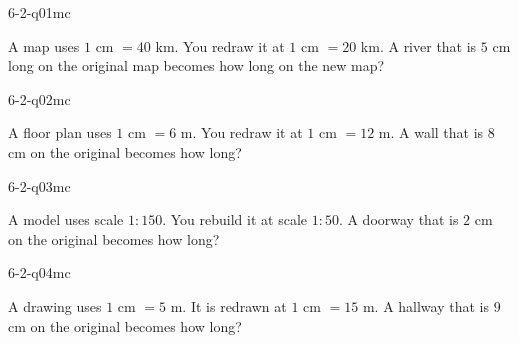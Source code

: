 

\begin{practiceQuestion}{6-2-q01}{mc}
\begin{questionText}
A map uses $1$ cm $= 40$ km. You redraw it at $1$ cm $= 20$ km. A river that is $5$ cm long on the original map becomes how long on the new map?
\end{questionText}
\end{practiceQuestion}

\begin{practiceQuestion}{6-2-q02}{mc}
\begin{questionText}
A floor plan uses $1$ cm $= 6$ m. You redraw it at $1$ cm $= 12$ m. A wall that is $8$ cm on the original becomes how long?
\end{questionText}
\end{practiceQuestion}

\begin{practiceQuestion}{6-2-q03}{mc}
\begin{questionText}
A model uses scale $1:150$. You rebuild it at scale $1:50$. A doorway that is $2$ cm on the original becomes how long?
\end{questionText}
\end{practiceQuestion}

\begin{practiceQuestion}{6-2-q04}{mc}
\begin{questionText}
A drawing uses $1$ cm $= 5$ m. It is redrawn at $1$ cm $= 15$ m. A hallway that is $9$ cm on the original becomes how long?
\end{questionText}
\end{practiceQuestion}

